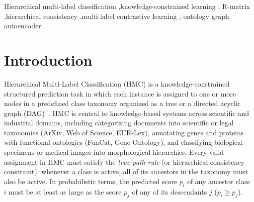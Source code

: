 \documentclass[preprint,12pt]{elsarticle}
\begin{document}
\begin{frontmatter}
\begin{keyword}
Hierarchical multi-label classification \sep knowledge-constrained learning \sep
R-matrix \sep hierarchical consistency \sep multi-label contrastive learning \sep
ontology graph autoencoder
\end{keyword}

\end{frontmatter}

\section{Introduction}

Hierarchical Multi-Label Classification (HMC) is a knowledge-constrained
structured prediction task in which each instance is assigned to one or more
nodes in a predefined class taxonomy organized as a tree or a directed acyclic
graph (DAG)~\cite{silla2011hmc}. HMC is central to knowledge-based systems
across scientific and industrial domains, including categorizing documents
into scientific or legal taxonomies (ArXiv, Web of Science, EUR-Lex),
annotating genes and proteins with functional ontologies (FunCat, Gene
Ontology), and classifying biological specimens or medical images into
morphological hierarchies. Every valid assignment in HMC must satisfy the
\emph{true-path rule} (or hierarchical consistency constraint): whenever a
class is active, all of its ancestors in the taxonomy must also be active. In
probabilistic terms, the predicted score $p_i$ of any ancestor class $i$ must
be at least as large as the score $p_j$ of any of its descendants $j$
($p_i \geq p_j$).
\end{document}
